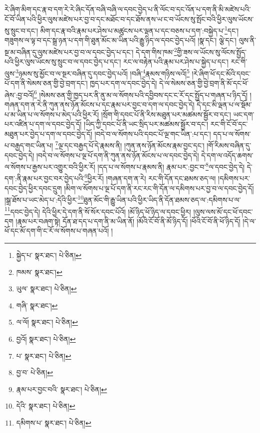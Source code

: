 རེ་ཞིག་མིག་དང་རྣ་བ་དག་རེ་རེ་ཞིང་དོན་བཞི་བཞི་ལ་དབང་བྱེད་པ་ནི་ལོང་བ་དང་འོན་པ་དག་ནི་མི་མཛེས་པའི་ངོ་བོ་ཡིན་པའི་ཕྱིར་ལུས་མཛེས་པར་བྱ་བ་དང་མཐོང་བ་དང་ཐོས་ནས་ཡ་ང་བ་ཡོངས་སུ་སྤོང་བའི་ཕྱིར་ལུས་ཡོངས་སུ་སྲུང་བ་དང་། མིག་དང་རྣ་བའི་རྣམ་པར་ཤེས་པ་མཚུངས་པར་ལྡན་པ་དང་བཅས་པ་དག་:བསྐྱེད་པ་\footnote{སྐྱེད་པ་  སྣར་ཐང་།  པེ་ཅིན། }དང་། གཟུགས་ལ་ལྟ་བ་དང་སྒྲ་ཉན་པ་དག་གི་ཐུན་མོང་མ་ཡིན་པའི་རྒྱུ་ཉིད་ལ་དབང་བྱེད་པའོ། །སྣ་དང་། ལྕེ་དང་། ལུས་ནི་སྔ་མ་བཞིན་དུ་ལུས་མཛེས་པར་བྱ་བ་ལ་དབང་བྱེད་པ་དང་། དེ་དག་གིས་ཁམ་\footnote{ཁམས་  སྣར་ཐང་། }གྱི་ཟས་ལ་ཡོངས་སུ་ལོངས་སྤྱོད་པའི་ཕྱིར་ལུས་ཡོངས་སུ་སྲུང་བ་ལ་དབང་བྱེད་པ་དང་། རང་ལ་བརྟེན་པའི་རྣམ་པར་ཤེས་པ་སྐྱེད་པ་དང་། རང་གི་ལུས་\footnote{ཡུལ་  སྣར་ཐང་།  པེ་ཅིན། }ཉམས་སུ་མྱོང་བ་ལ་སྔར་བཞིན་དུ་དབང་བྱེད་པའོ། །བཞི་\footnote{གཞི་  སྣར་ཐང་། }རྣམས་གཉིས་ལའོ།\footnote{ལ་ལོ།  སྣར་ཐང་།  པེ་ཅིན། } །རེ་ཞིག་ཕོ་དང་མོའི་དབང་པོ་དག་ནི་སེམས་ཅན་གྱི་བྱེ་བྲག་དང་། ཁྱད་པར་དག་ལ་དབང་བྱེད་དེ། དེ་ལ་སེམས་ཅན་གྱི་བྱེ་བྲག་ནི་མོ་དང་ཕོ་ཞེས་:བྱ་བའོ།\footnote{བྱའོ།  སྣར་ཐང་།  པེ་ཅིན། } །སེམས་ཅན་གྱི་ཁྱད་པར་ནི་ནུ་མ་ལ་སོགས་པའི་དབྱིབས་དང་ང་རོ་དང་སྤྱོད་པ་གཞན་པ་ཉིད་དོ། །གཞན་དག་ན་རེ་ནི་ཀུན་ནས་ཉོན་མོངས་པ་དང་རྣམ་པར་བྱང་བ་དག་ལ་དབང་བྱེད་དེ། དེ་དང་མི་ལྡན་པ་ལ་སྡོམ་པ་མ་ཡིན་པ་ལ་སོགས་པ་མེད་པའི་ཕྱིར་རོ། །སྲོག་གི་དབང་པོ་ནི་རིས་མཐུན་པར་མཚམས་སྦྱོར་བ་དང་། ཡང་དག་པར་འཛིན་པ་དག་ལ་དབང་བྱེད་དོ། །ཡིད་ཀྱི་དབང་པོ་ནི་ཡང་སྲིད་པར་མཚམས་སྦྱོར་བ་དང་། རང་གི་ངོ་བོ་དང་མཐུན་པར་བྱེད་པ་དག་ལ་དབང་བྱེད་དོ། །བདེ་བ་ལ་སོགས་པའི་དབང་པོ་ལྔ་གང་ཡིན་:པ་དང་། དད་པ་ལ་སོགས་པ་བརྒྱད་གང་ཡིན་པ། \footnote{པ་  སྣར་ཐང་།  པེ་ཅིན། }ལྔ་དང་བརྒྱད་པོ་དེ་རྣམས་ནི། །ཀུན་ནས་ཉོན་མོངས་རྣམ་བྱང་དང་། །གོ་རིམས་བཞིན་དུ་དབང་བྱེད་དེ། །བདེ་བ་ལ་སོགས་པ་ལྔ་པོ་དག་ནི་ཀུན་ནས་ཉོན་མོངས་པ་ལ་དབང་བྱེད་དེ། དེ་དག་ལ་འདོད་ཆགས་ལ་སོགས་པ་རྒྱས་པར་འགྱུར་བའི་ཕྱིར་རོ། །དད་པ་ལ་སོགས་པ་རྣམས་ནི། རྣམ་པར་:བྱང་བ་\footnote{བྱ་བ་  པེ་ཅིན། }ལ་དབང་བྱེད་དེ། དེ་དག་:ནི་རྣམ་པར་བྱང་བར་བྱེད་པའི་\footnote{རྣམ་པར་བྱང་བའི་  སྣར་ཐང་།  པེ་ཅིན། }ཕྱིར་རོ། །གཞན་དག་ན་རེ། རང་གི་དོན་དང་ཐམས་ཅད་ལ། །དམིགས་པར་དབང་བྱེད་ཕྱིར་དབང་དྲུག །མིག་ལ་སོགས་པ་ལྔ་པོ་དག་ནི་རང་རང་གི་དོན་ལ་དམིགས་པར་བྱ་བ་ལ་དབང་བྱེད་དོ། །སྒྲ་ཐོས་པ་ཡང་མེད་པ་:དེའི་ཕྱིར་\footnote{དེའི་  སྣར་ཐང་།  པེ་ཅིན། }ཐུན་མོང་གི་རྒྱུ་ཡིན་པའི་ཕྱིར་ཡིད་ནི་དོན་ཐམས་ཅད་ལ་:དམིགས་པ་ལ་\footnote{དམིགས་པ་  སྣར་ཐང་།  པེ་ཅིན། }དབང་བྱེད་དེ། དེའི་ཕྱིར་དེ་དག་ནི་སོ་སོར་དབང་པོའོ། །མོ་ཉིད་ཕོ་ཉིད་ལ་དབང་ཕྱིར། །ལུས་ལས་མོ་དང་ཕོ་དབང་དག །རྣམ་པར་བཞག་སྟེ། དོན་ཐ་དད་པ་དག་ནི་མ་ཡིན་ནོ། །མོའི་ངོ་བོ་ནི་མོ་ཉིད་དོ། །ཕོའི་ངོ་བོ་ནི་ཕོ་ཉིད་དོ། །དེ་ལ་ཕོ་དང་མོ་དག་གི་ང་རོ་ལ་སོགས་པ་གཞན་པའོ། །
